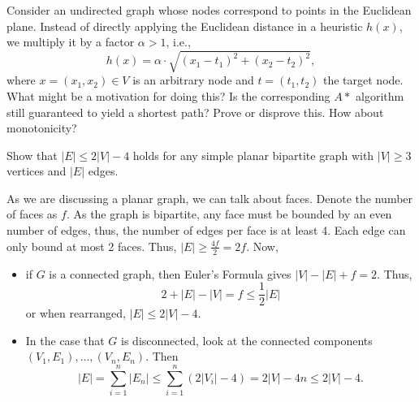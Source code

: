 \documentclass{article}
\begin{document}
\newpage

\begin{exercise}
    Consider an undirected graph whose nodes correspond to points in the Euclidean plane. Instead of directly applying the Euclidean distance in a heuristic $h(x)$, we multiply it by a factor $\alpha>1$, i.e.,
    \begin{equation*}
        h(x) = \alpha \cdot \sqrt{
            (x_1-t_1)^2+(x_2-t_2)^2
        },   
    \end{equation*}
    where $x= (x_1,x_2)\in V$ is an arbitrary node and $t= (t_1,t_2)$ the target node. What might be a motivation for doing this? Is the corresponding $A*$ algorithm still guaranteed to yield a shortest path? Prove or disprove this. How about monotonicity?
\end{exercise}
\newpage

\begin{exercise}\label{ex:planBipGraphs}
    Show that $|E|\leq 2|V| - 4$ holds for any simple planar bipartite graph with $|V|\geq 3$ vertices and $|E|$ edges.
\end{exercise}
\begin{solving}
    As we are discussing a planar graph, we can talk about faces. Denote the number of faces as $f$. As the graph is bipartite, any face must be bounded by an even number of edges, thus, the number of edges per face is at least 4. Each edge can only bound at most 2 faces. Thus, $|E|\geq \frac{4f}{2} = 2f$. Now,\begin{itemize}
        \item if $G$ is a connected graph, then Euler's Formula gives $|V|-|E| + f = 2$. Thus, \begin{equation*}
            2+  |E| -|V| = f \leq \frac12 |E|
        \end{equation*}
        or when rearranged, $|E|\leq 2|V|-4$.
        \item In the case that $G$ is disconnected, look at the connected components $(V_1,E_1), \dots, (V_n, E_n)$. Then \begin{equation*}
            |E| = \sum_{i=1}^n |E_n| \leq \sum_{i=1}^n\left( 2|V_i| - 4\right) = 2|V|-4n \leq 2|V|-4.
        \end{equation*}
    \end{itemize}
\end{solving}
\newpage
\end{document}
